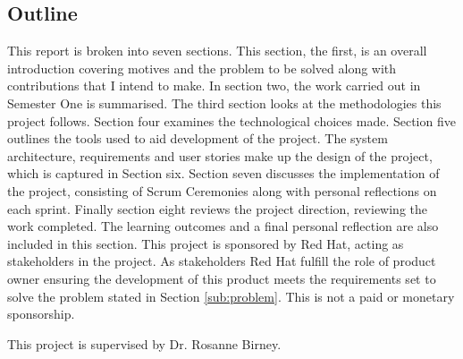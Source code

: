 \subsection{Outline}
This report is broken into seven sections. This section, the first, is an overall introduction covering motives and the problem to be solved along with contributions that I intend to make. In section two, the work carried out in Semester One is summarised. The third section looks at  the methodologies this project follows. Section four examines the technological choices made. Section five outlines the tools used to aid development of the project. The system architecture, requirements and user stories make up the design of the project, which is captured in Section six. Section seven discusses the implementation of the project,  consisting of Scrum Ceremonies along with personal reflections on each sprint. Finally section eight reviews the project direction, reviewing the work completed. The learning outcomes and a final personal reflection are also included in this section.
\clearpage 
This project is sponsored by Red Hat, acting as stakeholders in the project. As stakeholders Red Hat fulfill the role of product owner ensuring the development of this product meets the requirements set to solve the problem stated in Section \ref{sub:problem}. This is not a paid or monetary sponsorship.

This project is supervised by Dr. Rosanne Birney.